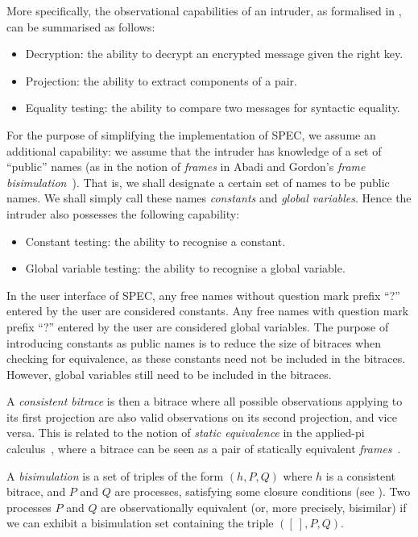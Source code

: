 \documentclass{article}
\begin{document}
More specifically, the observational capabilities of an intruder, as formalised in \cite{abadi98njc},
can be summarised as follows:
\begin{itemize}
\item Decryption: the ability to decrypt an encrypted message given the right key. 
\item Projection: the ability to extract components of a pair. 
\item Equality testing: the ability to compare two messages for syntactic equality. 
\end{itemize}
For the purpose of simplifying the implementation of SPEC, we assume an additional
capability: we assume that the intruder has knowledge of a set of ``public'' names
(as in the notion of {\em frames} in Abadi and Gordon's {\em frame bisimulation}~\cite{abadi98njc}). 
That is, we shall designate a certain set of names to be public names. We shall simply
call these names {\em constants} and {\em global variables}. Hence the intruder also possesses the following capability: 
\begin{itemize}
\item Constant testing: the ability to recognise a constant.
\item Global variable testing: the ability to recognise a global variable.
\end{itemize}
In the user interface of SPEC, any free names without question mark prefix ``?'' entered by the user are considered constants.
Any free names with question mark prefix ``?'' entered by the user are considered global variables.
The purpose of introducing constants as public names is to reduce the size of bitraces
when checking for equivalence, as these constants need not be included in the bitraces.
However, global variables still need to be included in the bitraces.

A {\em consistent bitrace} is then a bitrace where all possible observations applying
to its first projection are also valid observations on its second projection, and vice versa. 
This is related to the notion of {\em static equivalence} in the applied-pi calculus~\cite{abadi01popl},
where a bitrace can be seen as a pair of statically equivalent {\em frames}~\cite{abadi01popl}. 

A {\em bisimulation} is a set of triples of the form $(h, P, Q)$ where $h$ is a consistent bitrace,
and $P$ and $Q$ are processes, satisfying some closure conditions (see \cite{tiu09corr}). 
Two processes $P$ and $Q$ are observationally equivalent (or, more precisely, bisimilar)
if we can exhibit a bisimulation set containing the triple $([~], P, Q)$.
\end{document}
